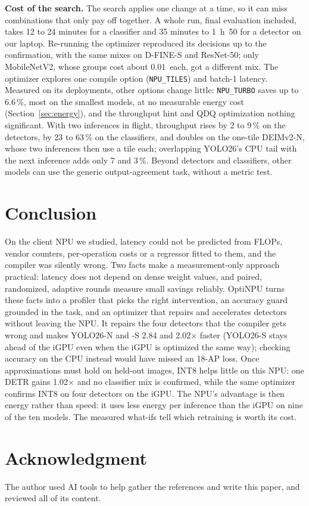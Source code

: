 \documentclass[conference]{IEEEtran}
\newcommand{\tool}{OptiNPU}
\newcommand{\ms}{\,\text{ms}}
\begin{document}
\textbf{Cost of the search.} The search applies one change at a time, so it can miss combinations that only pay off together. A whole run, final evaluation included, takes 12 to 24 minutes for a classifier and 35 minutes to 1~h~50 for a detector on our laptop. Re-running the optimizer reproduced its decisions up to the confirmation, with the same mixes on D-FINE-S and ResNet-50; only MobileNetV2, whose groups cost about 0.01\ms{} each, got a different mix. The optimizer explores one compile option (\texttt{NPU\_TILES}) and batch-1 latency. Measured on its deployments, other options change little: \texttt{NPU\_TURBO} saves up to 6.6\,\%, most on the smallest models, at no measurable energy cost (Section~\ref{sec:energy}), and the throughput hint and QDQ optimization nothing significant. With two inferences in flight, throughput rises by 2 to 9\,\% on the detectors, by 23 to 63\,\% on the classifiers, and doubles on the one-tile DEIMv2-N, whose two inferences then use a tile each; overlapping YOLO26's CPU tail with the next inference adds only 7 and 3\,\%. Beyond detectors and classifiers, other models can use the generic output-agreement task, without a metric test.

\section{Conclusion}

On the client NPU we studied, latency could not be predicted from FLOPs, vendor counters, per-operation costs or a regressor fitted to them, and the compiler was silently wrong. Two facts make a measurement-only approach practical: latency does not depend on dense weight values, and paired, randomized, adaptive rounds measure small savings reliably. \tool{} turns these facts into a profiler that picks the right intervention, an accuracy guard grounded in the task, and an optimizer that repairs and accelerates detectors without leaving the NPU. It repairs the four detectors that the compiler gets wrong and makes YOLO26-N and -S 2.84 and 2.02$\times$ faster (YOLO26-S stays ahead of the iGPU even when the iGPU is optimized the same way); checking accuracy on the CPU instead would have missed an 18-AP loss. Once approximations must hold on held-out images, INT8 helps little on this NPU: one DETR gains 1.02$\times$ and no classifier mix is confirmed, while the same optimizer confirms INT8 on four detectors on the iGPU. The NPU's advantage is then energy rather than speed: it uses less energy per inference than the iGPU on nine of the ten models. The measured what-ifs tell which retraining is worth its cost.

\section*{Acknowledgment}
The author used AI tools to help gather the references and write this paper, and reviewed all of its content.



\end{document}
